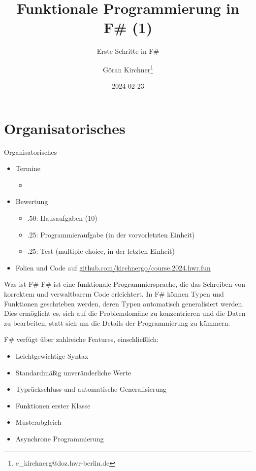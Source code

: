 \documentclass[t]{beamer}
\author{Göran Kirchner\thanks{e\_kirchnerg@doz.hwr-berlin.de}}
\date{2024-02-23}
\title{Funktionale Programmierung in F\# (1)}
\subtitle{Erste Schritte in F\#}
\begin{document}
\maketitle

\section{Organisatorisches }
\label{sec:org5fcc24f}

\begin{frame}[label={sec:org00f1a1b}]{Organisatorisches}
\begin{itemize}
\item Termine
\begin{itemize}
\item\relax [23.02, 15.03, 05.04, 19.04, 03.05]
\end{itemize}
\item Bewertung
\begin{itemize}
\item .50: Hausaufgaben (10)
\item .25: Programmieraufgabe (in der vorvorletzten Einheit)
\item .25: Test (multiple choice, in der letzten Einheit)
\end{itemize}
\item Folien und Code auf \href{https://github.com/kirchnergo/course.2023.hwr.fun}{github.com/kirchnergo/course.2024.hwr.fun}
\end{itemize}
\end{frame}

\begin{frame}[label={sec:orgb0c2084}]{Was ist F\#}
F\# ist eine funktionale Programmiersprache, die das Schreiben von korrektem und verwaltbarem Code erleichtert.
In F\# können Typen und Funktionen geschrieben werden, deren Typen automatisch generalisiert werden. Dies ermöglicht es, sich auf die Problemdomäne zu konzentrieren und die Daten zu bearbeiten, statt sich um die Details der Programmierung zu kümmern.

F\# verfügt über zahlreiche Features, einschließlich:
\begin{itemize}
\item Leichtgewichtige Syntax
\item Standardmäßig unveränderliche Werte
\item Typrückschluss und automatische Generalisierung
\item Funktionen erster Klasse
\item Musterabgleich
\item Asynchrone Programmierung
\end{itemize}
\end{frame}
\end{document}

